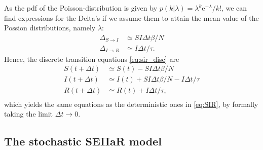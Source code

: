 As the pdf of the Poisson-distribution is given by $p(k\vert \lambda) = \lambda^k \mathrm{e}^{-\lambda}/k!$, we can find expressions for the Delta's if we assume them to attain the mean value of the Possion distributions, namely $\lambda$:
\begin{subequations}
	\begin{align}
		\Delta_{S\to I} &\simeq SI \Delta t \beta/N  \\
		\Delta_{I\to R} &\simeq I \Delta t/\tau.
	\end{align}
\end{subequations}
Hence, the discrete transition equations \eqref{eq:sir_disc} are 
\begin{subequations}\label{eq:sir_disc}
	\begin{align}
		S(t + \Delta t) &\simeq S(t) - SI \Delta t \beta/N\\
		I(t + \Delta t) &\simeq I(t) + SI \Delta t \beta/N - I \Delta t/\tau \\
		R(t + \Delta t) &\simeq R(t) + I \Delta t/\tau, \\
	\end{align}
\end{subequations}
which yields the same equations as the deterministic ones in \eqref{eq:SIR}, by formally taking the limit $\Delta t \to 0$.

\subsection{The stochastic SEIIaR model}

